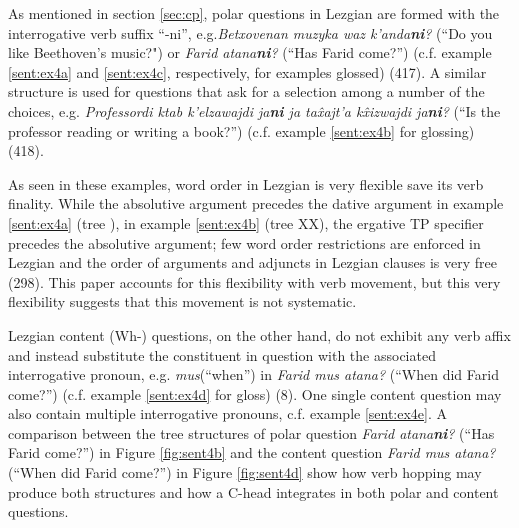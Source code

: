 As mentioned in section \ref{sec:cp}, polar questions in Lezgian are formed with the interrogative verb suffix ``-ni'', e.g.\textit{Betxovenan muzyka waz k'anda\textbf{ni}?} (``Do you like Beethoven's music?") or \textit{Farid atana\textbf{ni}?} (``Has Farid come?'') (c.f. example \ref{sent:ex4a} and \ref{sent:ex4c}, respectively, for examples glossed) (417). A similar structure is used for questions that ask for a selection among a number of the choices, e.g. \textit{Professordi ktab k'elzawajdi ja\textbf{ni} ja ta\^{x}ajt'a k\^{x}izwajdi ja\textbf{ni}?} (``Is the professor reading or writing a book?'') (c.f. example \ref{sent:ex4b} for glossing) (418).

As seen in these examples, word order in Lezgian is very flexible save its verb finality. While the absolutive argument precedes the dative argument in example \ref{sent:ex4a} (tree ), in example \ref{sent:ex4b} (tree XX), the ergative TP specifier precedes the absolutive argument; few word order restrictions are enforced in Lezgian and the order of arguments and adjuncts in Lezgian clauses is very free (298). This paper accounts for this flexibility with verb movement, but this very flexibility suggests that this movement is not systematic. 

Lezgian content (Wh-) questions, on the other hand, do not exhibit any verb affix and instead substitute the constituent in question with the associated interrogative pronoun, e.g. \textit{mus}(``when'') in \textit{Farid mus atana?} (``When did Farid come?'') (c.f. example \ref{sent:ex4d} for gloss) (8). One single content question may also contain multiple interrogative pronouns, c.f. example \ref{sent:ex4e}. A comparison between the tree structures of polar question \textit{Farid atana\textbf{ni}?} (``Has Farid come?'') in Figure \ref{fig:sent4b} and the content question \textit{Farid mus atana?} (``When did Farid come?'') in Figure \ref{fig:sent4d} show how verb hopping may produce both structures and how a C-head integrates in both polar and content questions. 
